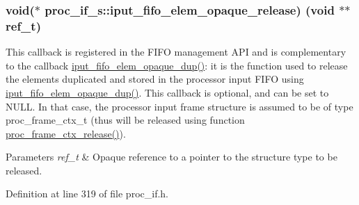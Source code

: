 \subsubsection[{\texorpdfstring{iput\+\_\+fifo\+\_\+elem\+\_\+opaque\+\_\+release}{iput_fifo_elem_opaque_release}}]{\setlength{\rightskip}{0pt plus 5cm}void($\ast$ proc\+\_\+if\+\_\+s\+::iput\+\_\+fifo\+\_\+elem\+\_\+opaque\+\_\+release) (void $\ast$$\ast$ref\+\_\+t)}\hypertarget{structproc__if__s_aec3bf948ff945ac2f5a4c834ea3b57da}{}\label{structproc__if__s_aec3bf948ff945ac2f5a4c834ea3b57da}
This callback is registered in the F\+I\+FO management A\+PI and is complementary to the callback \textquotesingle{}\hyperlink{structproc__if__s_a558cec57df436699d4154775894f2313}{iput\+\_\+fifo\+\_\+elem\+\_\+opaque\+\_\+dup()}\textquotesingle{}\+: it is the function used to release the elements duplicated and stored in the processor input F\+I\+FO using \textquotesingle{}\hyperlink{structproc__if__s_a558cec57df436699d4154775894f2313}{iput\+\_\+fifo\+\_\+elem\+\_\+opaque\+\_\+dup()}\textquotesingle{}. This callback is optional, and can be set to N\+U\+LL. In that case, the processor input frame structure is assumed to be of type proc\+\_\+frame\+\_\+ctx\+\_\+t (thus will be released using function \textquotesingle{}\hyperlink{proc__if_8c_afad6906a6da22ba369b736863c1e204e}{proc\+\_\+frame\+\_\+ctx\+\_\+release()}\textquotesingle{}). 
\begin{DoxyParams}{Parameters}
{\em ref\+\_\+t} & Opaque reference to a pointer to the structure type to be released. \\
\hline
\end{DoxyParams}


Definition at line 319 of file proc\+\_\+if.\+h.

